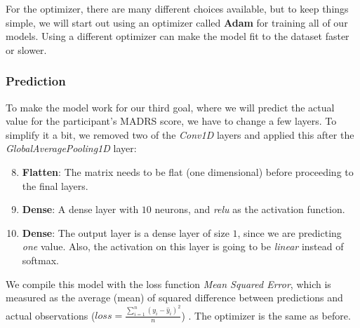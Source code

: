 For the optimizer, there are many different choices available,
but to keep things simple, we will start out using an optimizer called \textbf{Adam} for training all of our models. Using a different optimizer can make the 
model fit to the dataset faster or slower. 

\subsubsection{Prediction}
To make the model work for our third goal, where we will predict the actual value for the participant's MADRS score, we have to change a few layers. To simplify it a bit, we removed two of the \textit{Conv1D} layers and applied this after the \textit{GlobalAveragePooling1D} layer:

\begin{enumerate}
      \setcounter{enumi}{7}
      \item \textbf{Flatten}: The matrix needs to be flat (one dimensional) before proceeding to the final layers.
      \item \textbf{Dense}: A dense layer with $10$ neurons, and \textit{relu} as the activation function. 
      \item \textbf{Dense}: The output layer is a dense layer of size $1$, since we are predicting \textit{one} value. 
            Also, the activation on this layer is going to be \textit{linear} instead of softmax.
\end{enumerate}

We compile this model with the loss function \textit{Mean Squared Error}, which is measured as the average (mean) of squared difference between predictions and actual observations ($ loss = \frac{\sum_{i=1}^{n}(y_i-\hat{y}_i)^2}{n} $) \cite{loss_functions}. The optimizer is the same as before.


